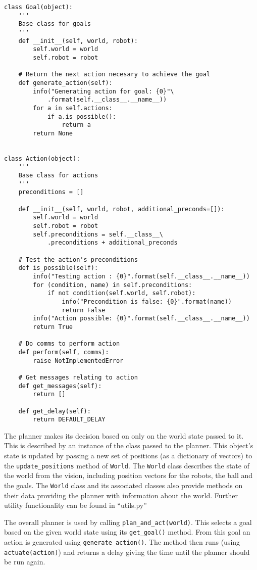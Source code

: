 \begin{lstlisting}
class Goal(object):
    '''
    Base class for goals
    '''
    def __init__(self, world, robot):
        self.world = world
        self.robot = robot

    # Return the next action necesary to achieve the goal
    def generate_action(self):
        info("Generating action for goal: {0}"\
        	.format(self.__class__.__name__))
        for a in self.actions:
            if a.is_possible():
                return a
        return None


class Action(object):
    '''
    Base class for actions
    '''
    preconditions = []

    def __init__(self, world, robot, additional_preconds=[]):
        self.world = world
        self.robot = robot
        self.preconditions = self.__class__\
        	.preconditions + additional_preconds

    # Test the action's preconditions
    def is_possible(self):
        info("Testing action : {0}".format(self.__class__.__name__))
        for (condition, name) in self.preconditions:
            if not condition(self.world, self.robot):
                info("Precondition is false: {0}".format(name))
                return False
        info("Action possible: {0}".format(self.__class__.__name__))
        return True

    # Do comms to perform action
    def perform(self, comms):
        raise NotImplementedError

    # Get messages relating to action
    def get_messages(self):
        return []

    def get_delay(self):
        return DEFAULT_DELAY

\end{lstlisting}

The planner makes its decision based on only on the world state passed to it. This is described by an instance of the  class passed to the planner. This object's state is updated by passing a new set of positions (as a dictionary of vectors) to the \texttt{update\_positions} method of \texttt{World}. The \texttt{World} class describes the state of the world from the vision, including position vectors for the robots, the ball and the goals. The \texttt{World} class and its associated classes also provide methods on their data providing the planner with information about the world. Further utility functionality can be found in ``utils.py''

The overall planner is used by calling \texttt{plan\_and\_act(world)}.
This selects a goal based on the given world state  using its \texttt{get\_goal()} method. From this goal an action is generated using \texttt{generate\_action()}. The method then runs (using \texttt{actuate(action)}) and returns a delay giving the time until the planner should be run again.

